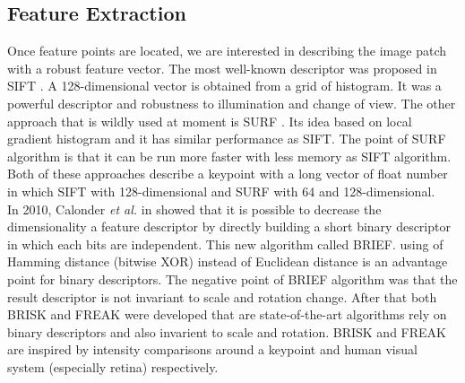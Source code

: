 \subsection{Feature Extraction}
Once feature points are located, we are interested in describing the image patch with a robust feature vector. The most well-known descriptor was proposed in SIFT \cite{lowe2004distinctive}. A 128-dimensional vector is obtained from a grid of histogram. It was a powerful descriptor and robustness to illumination and change of view. The other approach that is wildly used at moment is SURF \cite{bay2006surf}. Its idea based on local gradient histogram and it has similar performance as SIFT. The point of SURF algorithm is that it can be run more faster with less memory as SIFT algorithm. Both of these approaches describe a keypoint with a long vector of float number in which SIFT with 128-dimensional and SURF with 64 and 128-dimensional.\\
In 2010, Calonder \textit{et al.} in \cite{calonder2010brief} showed that it is possible to decrease the dimensionality a feature descriptor by directly building a short binary descriptor in which each bits are independent. This new algorithm called BRIEF. using of Hamming distance (bitwise XOR) instead of Euclidean distance is an advantage point for binary descriptors. The negative point of BRIEF algorithm was that the result descriptor is not invariant to scale and rotation change. After that both BRISK \cite{leutenegger2011brisk} and FREAK \cite{alahi2012freak} were developed that are state-of-the-art algorithms rely on binary descriptors and also invarient to scale and rotation. BRISK and FREAK are inspired by intensity comparisons around a keypoint and human visual system (especially retina) respectively.

